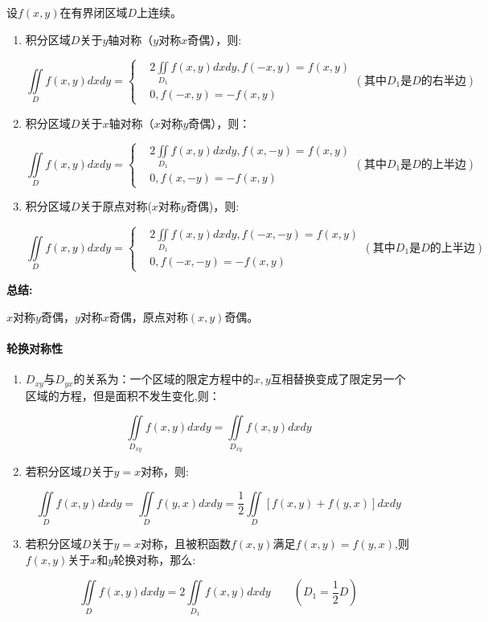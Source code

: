 \documentclass[
]{article}
\begin{document}
设\(f(x,y)\)在有界闭区域\(D\)上连续。

\begin{enumerate}
\def\labelenumi{\arabic{enumi}.}
\item
  积分区域\(D\)关于\(y\)轴对称（\(y\)对称\(x\)奇偶），则:

  \[\iint\limits_D f(x,y)dxdy = \left \{ \begin{aligned}& 2\iint\limits_{D_1}f(x,y)dxdy,f(-x,y)=f(x,y) \\ &0,f(-x,y)=-f(x,y)\end{aligned} \right.(其中D_1是D的右半边)\]
\item
  积分区域\(D\)关于\(x\)轴对称（\(x\)对称\(y\)奇偶），则：

  \[\iint\limits_D f(x,y)dxdy = \left \{ \begin{aligned}& 2\iint\limits_{D_1}f(x,y)dxdy,f(x,-y)=f(x,y) \\ &0,f(x,-y)=-f(x,y)\end{aligned} \right.(其中D_1是D的上半边)\]
\item
  积分区域\(D\)关于原点对称(\(x\)对称\(y\)奇偶)，则:

  \[\iint\limits_D f(x,y)dxdy = \left \{ \begin{aligned}& 2\iint\limits_{D_1}f(x,y)dxdy,f(-x,-y)=f(x,y) \\ &0,f(-x,-y)=-f(x,y)\end{aligned} \right.(其中D_1是D的上半边)\]
\end{enumerate}

\textbf{总结:}

\(x\)对称\(y\)奇偶，\(y\)对称\(x\)奇偶，原点对称\((x,y)\)奇偶。

\hypertarget{ux8f6eux6362ux5bf9ux79f0ux6027}{%
\paragraph{轮换对称性}\label{ux8f6eux6362ux5bf9ux79f0ux6027}}

\begin{enumerate}
\def\labelenumi{\arabic{enumi}.}
\item
  \(D_{xy}\)与\(D_{yx}\)的关系为：一个区域的限定方程中的\(x,y\)互相替换变成了限定另一个区域的方程，但是面积不发生变化,则：

  \[\iint\limits_{D_{xy}} f(x,y) dxdy =\iint\limits_{D_{xy}} f(x,y) dxdy\]
\item
  若积分区域\(D\)关于\(y=x\)对称，则:

  \[\iint\limits_D f(x,y) dxdy = \iint\limits_D f(y,x) dxdy =\frac{1}{2} \iint\limits_D [f(x,y)+f(y,x)] dxdy\]
\item
  若积分区域\(D\)关于\(y=x\)对称，且被积函数\(f(x,y)\)满足\(f(x,y)=f(y,x)\),则\(f(x,y)\)关于\(x\)和\(y\)轮换对称，那么:

  \[\iint\limits_D f(x,y) dxdy =2\iint\limits_{D_1} f(x,y) dxdy \qquad (D_1 = \frac{1}{2} D)\]
\end{enumerate}
\end{document}
